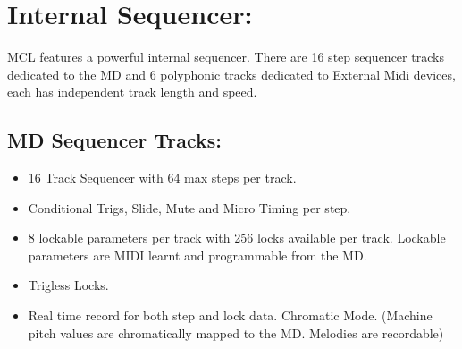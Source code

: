 \chapter{Internal Sequencer:}
MCL features a powerful internal sequencer. There are 16 step sequencer tracks dedicated to the MD and 6 polyphonic tracks dedicated to External Midi devices, each has independent track length and speed.
\section{MD Sequencer Tracks:}
\begin{itemize}
\item 16 Track Sequencer with 64 max steps per track.
\item Conditional Trigs, Slide, Mute and Micro Timing per step.
\item 8 lockable parameters per track with 256 locks available per track. Lockable parameters are MIDI learnt and programmable from the MD.
\item Trigless Locks.
\item Real time record for both step and lock data.
Chromatic Mode. (Machine pitch values are chromatically mapped to the MD. Melodies are recordable)
\end{itemize}
